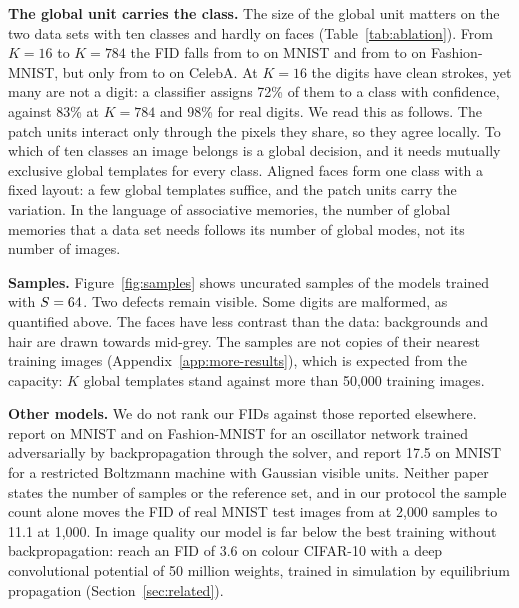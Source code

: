 \documentclass{article}
\begin{document}
\textbf{The global unit carries the class.}
The size of the global unit matters on the two data sets with ten classes
and hardly on faces (Table~\ref{tab:ablation}). From $K=16$ to $K=784$ the
FID falls from \FIDmnistSmallK{} to \FIDmnistExact{} on MNIST and from
\FIDfashionSmallK{} to \FIDfashionExact{} on Fashion-MNIST, but only from
\FIDcelebLowExact{} to \FIDcelebLowLargeK{} on CelebA. At $K=16$ the digits
have clean strokes, yet many are not a digit: a classifier assigns 72\% of
them to a class with confidence, against 83\% at $K=784$ and 98\% for real
digits. We read this as follows. The patch units interact only through the
pixels they share, so they agree locally. To which of ten classes an image
belongs is a global decision, and it needs mutually exclusive global
templates for every class. Aligned faces form one class with a fixed layout:
a few global templates suffice, and the patch units carry the variation.
In the language of associative memories, the number of global memories that
a data set needs follows its number of global modes, not its number of
images.

\textbf{Samples.}
Figure~\ref{fig:samples} shows uncurated samples of the models trained with
$S=64$. Two defects remain visible. Some digits are malformed, as
quantified above. The faces have less contrast than the data: backgrounds and
hair are drawn towards mid-grey. The samples are not copies of their nearest
training images (Appendix~\ref{app:more-results}), which is expected from the
capacity: $K$ global templates stand against more than 50{,}000 training
images.

\textbf{Other models.}
We do not rank our FIDs against those reported elsewhere.
\citet{wangachour2026} report \FIDwaMnist{} on MNIST and \FIDwaFashion{} on
Fashion-MNIST for an oscillator network trained adversarially by
backpropagation through the solver, and \citet{liao2022gaussian} report 17.5
on MNIST for a restricted Boltzmann machine with Gaussian visible units.
Neither paper states the number of samples or the reference set, and in our
protocol the sample count alone moves the FID of real MNIST test images from
\floorMnist{} at 2{,}000 samples to 11.1 at 1{,}000. In image quality our
model is far below the best training without backpropagation:
\citet{gower2026potentialep} reach an FID of 3.6 on colour CIFAR-10 with a
deep convolutional potential of 50 million weights, trained in simulation by
equilibrium propagation (Section~\ref{sec:related}).
\end{document}
